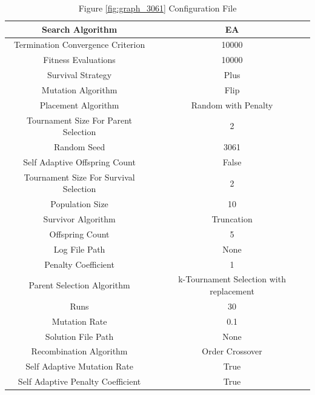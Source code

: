 \documentclass{standalone}
\begin{document}
\clearpage
\begin{table}[!htb]
	\centering
	\caption{Figure \ref{fig:graph_3061} Configuration File}
	\label{tab:graph_3061}
	\begin{tabular}{| c | c |}
		\hline
		Search Algorithm		& EA		 \\
		\hline
		Termination Convergence Criterion		& 10000		 \\
		\hline
		Fitness Evaluations		& 10000		 \\
		\hline
		Survival Strategy		& Plus		 \\
		\hline
		Mutation Algorithm		& Flip		 \\
		\hline
		Placement Algorithm		& Random with Penalty		 \\
		\hline
		Tournament Size For Parent Selection		& 2		 \\
		\hline
		Random Seed		& 3061		 \\
		\hline
		Self Adaptive Offspring Count		& False		 \\
		\hline
		Tournament Size For Survival Selection		& 2		 \\
		\hline
		Population Size		& 10		 \\
		\hline
		Survivor Algorithm		& Truncation		 \\
		\hline
		Offspring Count		& 5		 \\
		\hline
		Log File Path		& None		 \\
		\hline
		Penalty Coefficient		& 1		 \\
		\hline
		Parent Selection Algorithm		& k-Tournament Selection with replacement		 \\
		\hline
		Runs		& 30		 \\
		\hline
		Mutation Rate		& 0.1		 \\
		\hline
		Solution File Path		& None		 \\
		\hline
		Recombination Algorithm		& Order Crossover		 \\
		\hline
		Self Adaptive Mutation Rate		& True		 \\
		\hline
		Self Adaptive Penalty Coefficient		& True		 \\
		\hline
	\end{tabular}
\end{table}
\end{document}

